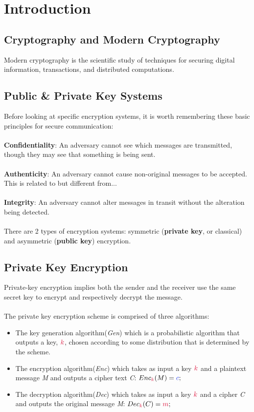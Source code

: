\chapter{Introduction}
\section{Cryptography and Modern Cryptography}
    
    Modern cryptography is the scientific study of techniques for securing digital information, transactions, and distributed computations.
    
\section{Public \& Private Key Systems}
    Before looking at specific encryption systems, it is worth remembering these basic principles for secure communication:\\
    \\
    \textbf{Confidentiality}: An adversary cannot see which messages are transmitted, though they may see that something is being sent.\\
    \\
    \textbf{Authenticity}: An adversary cannot cause non-original messages to be accepted. This is related to but different from...\\
    \\
    \textbf{Integrity}: An adversary cannot alter messages in transit without the alteration being detected.\\
    \\
    There are 2 types of encryption systems: symmetric (\textbf{private key}, or classical) and asymmetric (\textbf{public key}) encryption.\\

\section{Private Key Encryption}

    Private-key encryption implies both the sender and the receiver use the same secret key to encrypt and respectively decrypt the message.\\
    \\
    The private key encryption scheme is comprised of three algorithms:
    
    \begin{itemize}
      \item The key generation algorithm(\textit{Gen}) which is a probabilistic algorithm that outputs a key, $\ck$, chosen according to some distribution that is determined by the scheme.
      \item The encryption algorithm(\textit{Enc}) which takes as input a key $\ck$ and a plaintext message \textit{M} and outputs a cipher text \textit{C}: $Enc_\ck(M) = \cc;$
      \item The decryption algorithm(\textit{Dec}) which takes as input a key $\ck$ and a cipher \textit{C} and outputs the original message \textit{M}: $Dec_\ck(C) = \cm;$
    \end{itemize}
    
